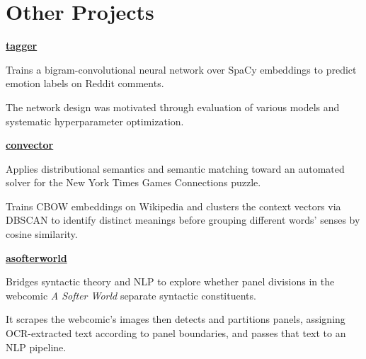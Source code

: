 \section{Other Projects}

\href{https://github.com/\github/tagger}{
    {\bfseries{\textsf{\small{tagger}}}} \scalebox{.8}\faGithub
} \hfill {}

\hfill\begin{minipage}[t]{0.8\textwidth}

\setlength{\parskip}{1em}
\vspace{0ex}
Trains a bigram-convolutional neural network over SpaCy embeddings to predict
emotion labels on Reddit comments.

The network design was motivated through evaluation of various models and
systematic hyperparameter optimization.

\end{minipage}
\vspace{2ex}

\href{https://github.com/\github/convector}{
    {\bfseries{\textsf{\small{convector}}}} \scalebox{.8}\faGithub
} \hfill {}

\hfill\begin{minipage}[t]{0.8\textwidth}

\setlength{\parskip}{1em}
\vspace{0ex}
Applies distributional semantics and semantic matching toward
an automated solver for the New York Times Games Connections puzzle.

Trains CBOW embeddings on Wikipedia and clusters the context vectors via
DBSCAN to identify distinct meanings
before grouping different words' senses by cosine similarity.

\end{minipage}
\vspace{2ex}

\href{https://github.com/\github/asofterworld}{
    {\bfseries{\textsf{\small{asofterworld}}}} \scalebox{.8}\faGithub
} \hfill {}

\hfill\begin{minipage}[t]{0.8\textwidth}

\setlength{\parskip}{1em}
\vspace{0ex}
Bridges syntactic theory and NLP to explore whether panel divisions in
the webcomic \textit{A Softer World} separate syntactic constituents.

It scrapes the webcomic's images then detects and partitions panels, assigning
OCR-extracted text according to panel boundaries, and passes that text to an
NLP pipeline.
\end{minipage}

